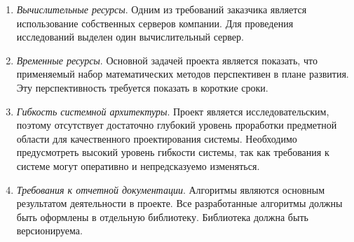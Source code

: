 \begin{enumerate}
    \item {
        \textit{Вычислительные ресурсы}.
        Одним из требований заказчика является использование собственных серверов компании.
        Для проведения исследований выделен один вычислительный сервер.
    }
    \item {
        \textit{Временные ресурсы}.
        Основной задачей проекта является показать, что применяемый набор математических
        методов перспективен в плане развития. Эту перспективность требуется показать в короткие сроки.
    }
    \item {
        \textit{Гибкость системной архитектуры}.
        Проект является исследовательским, поэтому
        отсутствует достаточно глубокий уровень проработки предметной области для качественного проектирования системы.
        Необходимо предусмотреть высокий уровень гибкости системы,
        так как требования к системе могут оперативно и непредсказуемо изменяться.
    }
    \item {
        \textit{Требования к отчетной документации}.
        Алгоритмы являются основным результатом деятельности в проекте.
        Все разработанные алгоритмы должны быть оформлены в отдельную библиотеку.
        Библиотека должна быть версионируема.
    }
\end{enumerate}
